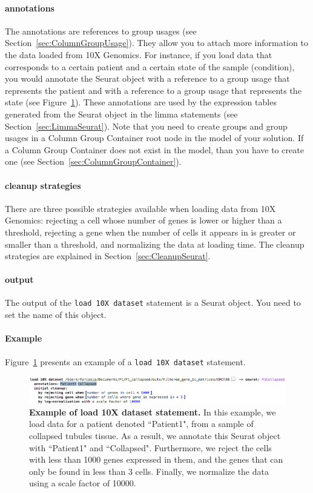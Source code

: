\paragraph{annotations} The annotations are references to group usages (see
Section~\ref{sec:ColumnGroupUsage}). They allow you to attach more information to
the data loaded from 10X Genomics. For instance, if you load data that corresponds
to a certain patient and a certain state of the sample (condition),
you would annotate the Seurat object with a reference to a group usage that represents the
patient and with a reference to a group usage that represents the state (see
Figure~\ref{fig:ExampleLoad10XDataset}).
These annotations are used by the expression tables generated from the Seurat object
in the limma statements (see Section~\ref{sec:LimmaSeurat}). Note that you
need to create groups and group usages in a Column Group Container root node
in the model of your solution. If a Column Group Container does not exist in
the model, than you have to create one (see Section~\ref{sec:ColumnGroupContainer}).

\paragraph{cleanup strategies}
There are three possible strategies available when loading data from 10X Genomics: rejecting
a cell whose number of genes is lower or higher than a threshold, rejecting a
gene when the number of cells it appears in is greater or smaller than a threshold, and
normalizing the data at loading time. The cleanup strategies are explained in
Section~\ref{sec:CleanupSeurat}.

\paragraph{output} The output of the \texttt{load 10X dataset} statement is a Seurat object.
You need to set the name of this object.

\paragraph{Example} Figure~\ref{fig:ExampleLoad10XDataset} presents an example of a
\texttt{load 10X dataset} statement.

\begin{figure}[h!tbp]
  \centering
  \includegraphics[width=\figWidthWide]{figures/ExampleLoad10XDataset.png}
    \caption[Example of load 10X dataset statement.]{\textbf{Example of load 10X dataset statement.}
    In this example, we load data for a patient denoted ``Patient1", from a sample of collapsed
    tubules tissue. As a result, we annotate this Seurat object with ``Patient1" and
    ``Collapsed". Furthermore, we reject the cells with less than 1000 genes expressed in
    them, and the genes that can only be found in less than 3 cells. Finally, we normalize
    the data using a scale factor of 10000.}
\label{fig:ExampleLoad10XDataset}
\end{figure}

